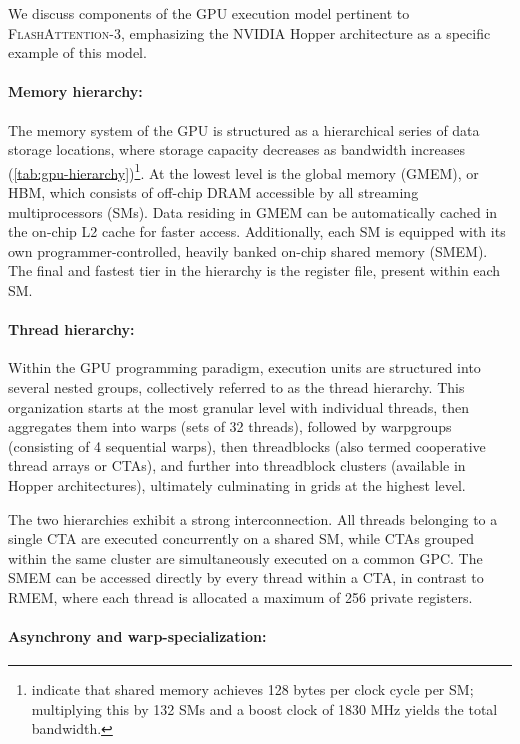 We discuss components of the GPU execution model pertinent to \textsc{FlashAttention-3}, emphasizing the NVIDIA Hopper architecture as a specific example of this model.

\paragraph{Memory hierarchy:} The memory system of the GPU is structured as a hierarchical series of data storage locations, where storage capacity decreases as bandwidth increases (\cref{tab:gpu-hierarchy})\footnote{\citet{luo2024benchmarking} indicate that shared memory achieves 128 bytes per clock cycle per SM; multiplying this by 132 SMs and a boost clock of 1830 MHz yields the total bandwidth.}. At the lowest level is the global memory (GMEM), or HBM, which consists of off-chip DRAM accessible by all streaming multiprocessors (SMs). Data residing in GMEM can be automatically cached in the on-chip L2 cache for faster access. Additionally, each SM is equipped with its own programmer-controlled, heavily banked on-chip shared memory (SMEM). The final and fastest tier in the hierarchy is the register file, present within each SM.

\paragraph{Thread hierarchy:} Within the GPU programming paradigm, execution units are structured into several nested groups, collectively referred to as the thread hierarchy. This organization starts at the most granular level with individual threads, then aggregates them into warps (sets of 32 threads), followed by warpgroups (consisting of 4 sequential warps), then threadblocks (also termed cooperative thread arrays or CTAs), and further into threadblock clusters (available in Hopper architectures), ultimately culminating in grids at the highest level.

The two hierarchies exhibit a strong interconnection. All threads belonging to a single CTA are executed concurrently on a shared SM, while CTAs grouped within the same cluster are simultaneously executed on a common GPC. The SMEM can be accessed directly by every thread within a CTA, in contrast to RMEM, where each thread is allocated a maximum of 256 private registers.

\paragraph{Asynchrony and warp-specialization:}

